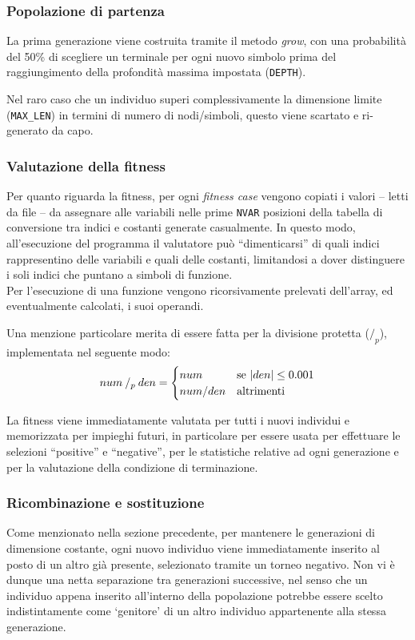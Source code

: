 \documentclass{../llncs}
\DeclarePairedDelimiter{\abs}{\lvert}{\rvert}
\begin{document}
\subsubsection{Popolazione di partenza}
La prima generazione viene costruita tramite il metodo \emph{grow}, con una probabilità del 50\% di scegliere un terminale per ogni nuovo simbolo prima del raggiungimento della profondità massima impostata (\texttt{DEPTH}).

Nel raro caso che un individuo superi complessivamente la dimensione limite (\texttt{MAX{\_}LEN}) in termini di numero di nodi/simboli, questo viene scartato e ri-generato da capo.

\subsubsection{Valutazione della fitness}
Per quanto riguarda la fitness, per ogni \emph{fitness case} vengono copiati i valori -- letti da file -- da assegnare alle variabili nelle prime \texttt{NVAR} posizioni della tabella di conversione tra indici e costanti generate casualmente. In questo modo, all'esecuzione del programma il valutatore può ``dimenticarsi'' di quali indici rappresentino delle variabili e quali delle costanti, limitandosi a dover distinguere i soli indici che puntano a simboli di funzione.\\

Per l'esecuzione di una funzione vengono ricorsivamente prelevati dell'array, ed eventualmente calcolati, i suoi operandi.

Una menzione particolare merita di essere fatta per la divisione protetta ($/_p$), implementata nel seguente modo:
\[
num \: /_p \: den =
\begin{cases}
num & \text{se $\abs{den}\le0.001$} \\
num/den & \text{altrimenti}
\end{cases}
\]

La fitness viene immediatamente valutata per tutti i nuovi individui e memorizzata per impieghi futuri, in particolare per essere usata per effettuare le selezioni ``positive'' e ``negative'', per le statistiche relative ad ogni generazione e per la valutazione della condizione di terminazione.

\subsubsection{Ricombinazione e sostituzione}
Come menzionato nella sezione precedente, per mantenere le generazioni di dimensione costante, ogni nuovo individuo viene immediatamente inserito al posto di un altro già presente, selezionato tramite un torneo negativo. Non vi è dunque una netta separazione tra generazioni successive, nel senso che un individuo appena inserito all'interno della popolazione potrebbe essere scelto indistintamente come `genitore' di un altro individuo appartenente alla stessa generazione.
\end{document}
